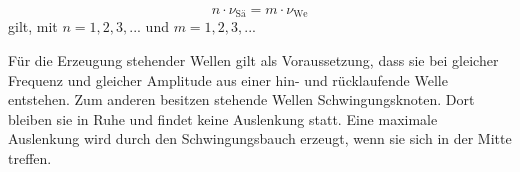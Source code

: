 \begin{equation}
n\cdot \nu_{\text{Sä}} = m \cdot \nu_{\text{We}}
\end{equation}
gilt, mit $n = 1,2,3,...$ und $m = 1,2,3,...$


Für die Erzeugung stehender Wellen gilt als Voraussetzung, dass sie bei gleicher Frequenz und gleicher Amplitude aus einer hin- und rücklaufende Welle entstehen. Zum anderen besitzen stehende Wellen Schwingungsknoten. Dort bleiben sie in Ruhe und findet keine Auslenkung statt. Eine maximale Auslenkung wird durch den Schwingungsbauch erzeugt, wenn sie sich in der Mitte treffen. 